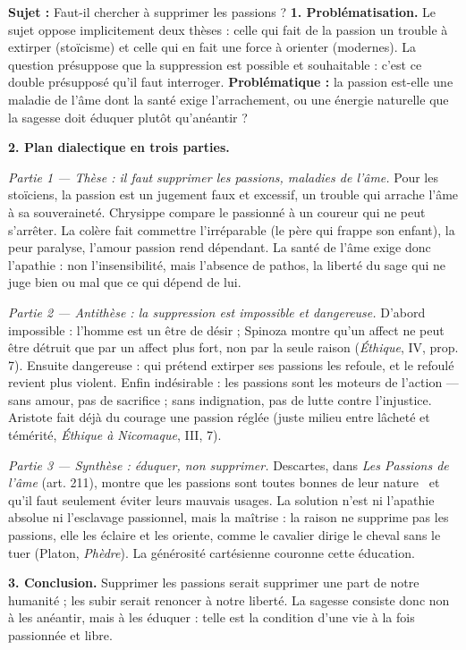 \documentclass[11pt]{article}
\newcommand{\cle}[1]{{\popxbold\color{popdark}#1}}
\begin{document}
\begin{exoresolu}
\textbf{Sujet :} Faut-il chercher à supprimer les passions ?
\tcblower
\textbf{1. Problématisation.} Le sujet oppose implicitement deux thèses : celle qui fait de la passion un trouble à extirper (stoïcisme) et celle qui en fait une force à orienter (modernes). La question présuppose que la suppression est possible et souhaitable : c'est ce double présupposé qu'il faut interroger. \textbf{Problématique :} la passion est-elle une maladie de l'âme dont la santé exige l'arrachement, ou une énergie naturelle que la sagesse doit éduquer plutôt qu'anéantir ?

\textbf{2. Plan dialectique en trois parties.}

\emph{Partie 1 — Thèse : il faut supprimer les passions, maladies de l'âme.} Pour les stoïciens, la passion est un jugement faux et excessif, un trouble qui arrache l'âme à sa souveraineté. Chrysippe compare le passionné à un coureur qui ne peut s'arrêter. La colère fait commettre l'irréparable (le père qui frappe son enfant), la peur paralyse, l'amour passion rend dépendant. La santé de l'âme exige donc l'\cle{apathie} : non l'insensibilité, mais l'absence de pathos, la liberté du sage qui ne juge bien ou mal que ce qui dépend de lui.

\emph{Partie 2 — Antithèse : la suppression est impossible et dangereuse.} D'abord impossible : l'homme est un être de désir ; Spinoza montre qu'un affect ne peut être détruit que par un affect plus fort, non par la seule raison (\emph{Éthique}, IV, prop. 7). Ensuite dangereuse : qui prétend extirper ses passions les refoule, et le refoulé revient plus violent. Enfin indésirable : les passions sont les moteurs de l'action — sans amour, pas de sacrifice ; sans indignation, pas de lutte contre l'injustice. Aristote fait déjà du courage une passion réglée (juste milieu entre lâcheté et témérité, \emph{Éthique à Nicomaque}, III, 7).

\emph{Partie 3 — Synthèse : éduquer, non supprimer.} Descartes, dans \emph{Les Passions de l'âme} (art. 211), montre que les passions \guillemotleft sont toutes bonnes de leur nature \guillemotright\ et qu'il faut seulement éviter leurs mauvais usages. La solution n'est ni l'apathie absolue ni l'esclavage passionnel, mais la \cle{maîtrise} : la raison ne supprime pas les passions, elle les éclaire et les oriente, comme le cavalier dirige le cheval sans le tuer (Platon, \emph{Phèdre}). La générosité cartésienne couronne cette éducation.

\textbf{3. Conclusion.} Supprimer les passions serait supprimer une part de notre humanité ; les subir serait renoncer à notre liberté. La sagesse consiste donc non à les anéantir, mais à les éduquer : telle est la condition d'une vie à la fois passionnée et libre.
\end{exoresolu}
\end{document}
